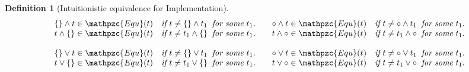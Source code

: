 \documentclass[12pt]{article}
\newtheorem{Definition}{Definition}[section]
\begin{document}
\begin{Definition}[Intuitionistic equivalence for Implementation]
\begin{displaymath}
\begin{array}{c}
      \begin{array}{ll}
        \begin{array}{l}
          \{\} \wedge t \in \mathpzc{Equ}(t)\quad \text{\it if}\ t \neq \{\}
           \wedge t_1\;\; \text{\it for some}\ t_1.  \\
          
          t \wedge \{\} \in \mathpzc{Equ}(t)\quad \text{\it if}\ t \neq t_1
           \wedge \{\}\;\; \text{\it for some}\ t_1.  \\
        \end{array}
        & \begin{array}{l}
            \circ \wedge t \in \mathpzc{Equ}(t)\quad \text{\it if}\
             t \neq \circ \wedge t_1\;\; \text{\it for some}\ t_1.  \\
             
             t \wedge \circ \in \mathpzc{Equ}(t)\quad \text{\it if}\
              t \neq t_1 \wedge \circ\;\; \text{\it for some}\ t_1.  \\
          \end{array}
      \end{array}  \\
      \\

      \begin{array}{ll}
        \begin{array}{l}
          \{\} \vee t \in \mathpzc{Equ}(t)\quad \text{\it if}\ t \neq \{\}
           \vee t_1\;\; \text{\it for some}\ t_1.  \\
          
           t \vee \{\} \in \mathpzc{Equ}(t)\quad \text{\it if}\ t \neq t_1
            \vee \{\}\;\; \text{\it for some}\ t_1.  \\
        \end{array}
        & \begin{array}{l}
            \circ \vee t \in \mathpzc{Equ}(t)\quad \text{\it if}\
             t \neq \circ \vee t_1\;\; \text{\it for some}\ t_1.  \\
             
             t \vee \circ \in \mathpzc{Equ}(t)\quad \text{\it if}\
             t \neq t_1 \vee \circ\;\; \text{\it for some}\ t_1.
          \end{array}
      \end{array}  \\   
      \\
      

\end{array}
\end{displaymath}
\end{Definition}
\end{document}
